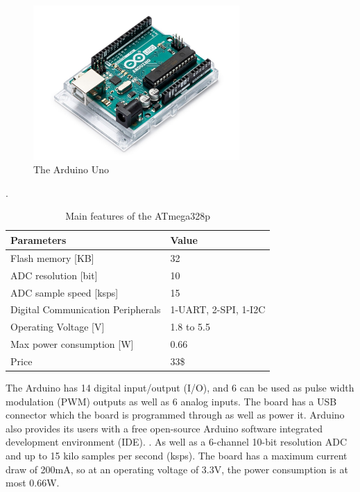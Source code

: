 \begin{figure}[h]
    \centering
    \includegraphics[width=0.70\textwidth]{graphics/ArduinoUNo.jpg}
    \caption{The Arduino Uno \cite{noauthor_arduino_nodate}}
    \label{fig:Arduino}
\end{figure}

\begin{table}[h]\caption{Main features of the ATmega328p \cite{noauthor_atmega328p_nodate}}.\label{Tab:ATmega328p}
\centering
    \begin{tabular}{|l|l|}
    \hline
        Parameters                        & Value                \\ \hline
        Flash memory [KB]                 & 32                      \\ \hline
        ADC resolution [bit]              & 10                   \\ \hline
        ADC sample speed [ksps]           & 15                     \\ \hline
        Digital Communication Peripherals & 1-UART, 2-SPI, 1-I2C \\ \hline
        Operating Voltage [V]             & 1.8 to 5.5           \\ \hline
        Max power consumption [W]         & 0.66               \\ \hline
        Price                             & 33\$                \\ \hline
    \end{tabular}
\end{table}


The Arduino has 14 digital input/output (I/O), and 6 can be used as pulse width modulation (PWM) outputs as well as 6 analog inputs.
The board has a USB connector which the board is programmed through as well as power it.
Arduino also provides its users with a free open-source Arduino software integrated development environment (IDE).  \cite{noauthor_arduino_nodate}.
As well as a 6-channel 10-bit resolution ADC and up to 15 kilo samples per second (ksps).
The board has a maximum current draw of 200mA, so at an operating voltage of 3.3V, the power consumption is at most 0.66W\cite{noauthor_atmega328p_nodate}.


